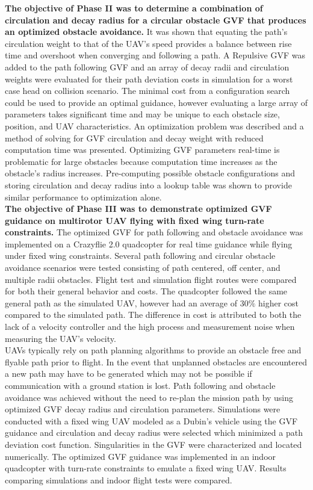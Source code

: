 \documentclass[numbered,pdftex]{ohio-etd}
\begin{document}
\textbf{The objective of Phase II was to determine a combination of circulation and decay radius for a circular obstacle GVF that produces an optimized obstacle avoidance.} It was shown that equating the path’s circulation weight to that of the UAV’s speed provides a balance between rise time and overshoot when converging and following a path. A Repulsive GVF was added to the path following GVF and an array of decay radii and circulation weights were evaluated for their path deviation costs in simulation for a worst case head on collision scenario. The minimal cost from a configuration search could be used to provide an optimal guidance, however evaluating a large array of parameters takes significant time and may be unique to each obstacle size, position, and UAV characteristics. An optimization problem was described and a method of solving for GVF circulation and decay weight with reduced computation time was presented. Optimizing GVF parameters real-time is problematic for large obstacles because computation time increases as the obstacle's radius increases. Pre-computing possible obstacle configurations and storing circulation and decay radius into a lookup table was shown to provide similar performance to optimization alone.\\

\textbf{The objective of Phase III was to demonstrate optimized GVF guidance on multirotor UAV flying with fixed wing turn-rate constraints.} The optimized GVF for path following and obstacle avoidance was implemented on a Crazyflie 2.0 quadcopter for real time guidance while flying under fixed wing constraints. Several path following and circular obstacle avoidance scenarios were tested consisting of path centered, off center, and multiple radii obstacles. Flight test and simulation flight routes were compared for both their general behavior and costs. The quadcopter followed the same general path as the simulated UAV, however had an average of $30 \%$ higher cost compared to the simulated path. The difference in cost is attributed to both the lack of a velocity controller and the high process and measurement noise when measuring the UAV’s velocity.  \\


UAVs typically rely on path planning algorithms to provide an obstacle free and flyable path prior to flight. In the event that unplanned obstacles are encountered a new path may have to be generated which may not be possible if communication with a ground station is lost. Path following and obstacle avoidance was achieved without the need to re-plan the mission path by using optimized GVF decay radius and circulation parameters. Simulations were conducted with a fixed wing UAV modeled as a Dubin's vehicle using the GVF guidance and circulation and decay radius were selected which minimized a path deviation cost function. Singularities in the GVF were characterized and located numerically. The optimized GVF guidance was implemented in an indoor quadcopter with turn-rate constraints to emulate a fixed wing UAV. Results comparing simulations and indoor flight tests were compared. \\
\end{document}
